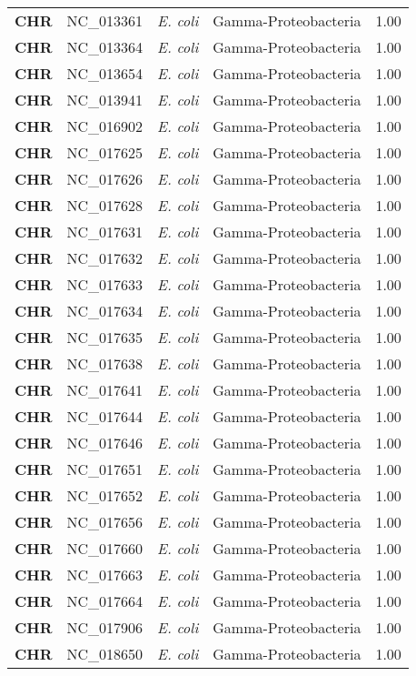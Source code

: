 \begin{adjustwidth}{-3cm}{2cm}
{\begin{supertabular}{>{\bfseries}l|p{0.1\textwidth}p{0.14\textwidth}l|l}
CHR & NC\_013361 & \textit{E. coli} & Gamma-Proteobacteria & 1.00\\
CHR & NC\_013364 & \textit{E. coli} & Gamma-Proteobacteria & 1.00\\
CHR & NC\_013654 & \textit{E. coli} & Gamma-Proteobacteria & 1.00\\
CHR & NC\_013941 & \textit{E. coli} & Gamma-Proteobacteria & 1.00\\
CHR & NC\_016902 & \textit{E. coli} & Gamma-Proteobacteria & 1.00\\
CHR & NC\_017625 & \textit{E. coli} & Gamma-Proteobacteria & 1.00\\
CHR & NC\_017626 & \textit{E. coli} & Gamma-Proteobacteria & 1.00\\
CHR & NC\_017628 & \textit{E. coli} & Gamma-Proteobacteria & 1.00\\
CHR & NC\_017631 & \textit{E. coli} & Gamma-Proteobacteria & 1.00\\
CHR & NC\_017632 & \textit{E. coli} & Gamma-Proteobacteria & 1.00\\
CHR & NC\_017633 & \textit{E. coli} & Gamma-Proteobacteria & 1.00\\
CHR & NC\_017634 & \textit{E. coli} & Gamma-Proteobacteria & 1.00\\
CHR & NC\_017635 & \textit{E. coli} & Gamma-Proteobacteria & 1.00\\
CHR & NC\_017638 & \textit{E. coli} & Gamma-Proteobacteria & 1.00\\
CHR & NC\_017641 & \textit{E. coli} & Gamma-Proteobacteria & 1.00\\
CHR & NC\_017644 & \textit{E. coli} & Gamma-Proteobacteria & 1.00\\
CHR & NC\_017646 & \textit{E. coli} & Gamma-Proteobacteria & 1.00\\
CHR & NC\_017651 & \textit{E. coli} & Gamma-Proteobacteria & 1.00\\
CHR & NC\_017652 & \textit{E. coli} & Gamma-Proteobacteria & 1.00\\
CHR & NC\_017656 & \textit{E. coli} & Gamma-Proteobacteria & 1.00\\
CHR & NC\_017660 & \textit{E. coli} & Gamma-Proteobacteria & 1.00\\
CHR & NC\_017663 & \textit{E. coli} & Gamma-Proteobacteria & 1.00\\
CHR & NC\_017664 & \textit{E. coli} & Gamma-Proteobacteria & 1.00\\
CHR & NC\_017906 & \textit{E. coli} & Gamma-Proteobacteria & 1.00\\
CHR & NC\_018650 & \textit{E. coli} & Gamma-Proteobacteria & 1.00\\

\end{supertabular}}
\end{adjustwidth}
